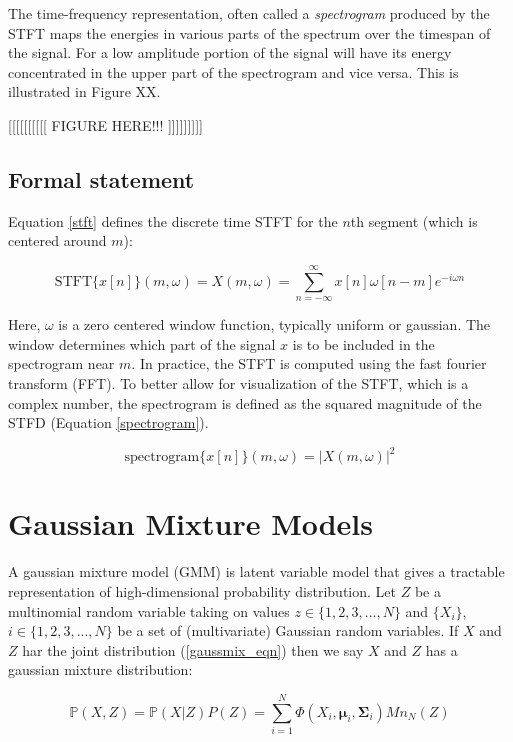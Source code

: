\documentclass[11pt, oneside, a4paper]{report}
\begin{document}
The time-frequency representation, often called a \emph{spectrogram} produced by the STFT maps the
energies in various parts of the spectrum over the timespan of the
signal. For a low amplitude portion of the signal will have its energy
concentrated in the upper part of the spectrogram and vice versa. This
is illustrated in Figure XX.

[[[[[[[[[[ FIGURE HERE!!! ]]]]]]]]]

\subsection{Formal statement}

Equation \ref{stft} defines the discrete time STFT for the $n$th
segment (which is centered around $m$):

\begin{equation}\label{stft}
  \text{STFT}\{x[n]\}(m,\omega)= X(m,\omega) =\sum_{n = -\infty}^{\infty}
  x[n]\omega[n-m]e^{-i\omega n}
\end{equation}

Here, $\omega$ is a zero centered window function, typically uniform
or gaussian. The window determines which part of the signal $x$ is to
be included in the spectrogram near $m$. In practice, the STFT is
computed using the fast fourier transform (FFT). To better allow for
visualization of the STFT, which is a complex number, the spectrogram
is defined as the squared magnitude of the STFD (Equation \ref{spectrogram}).

\begin{equation}\label{spectrogram}
  \text{spectrogram}\{x[n]\}(m,\omega) = |X(m,\omega)|^2 
\end{equation}


\section{Gaussian Mixture Models}\label{gmm_appendix}
A gaussian mixture model (GMM) is latent variable model that gives a
tractable representation of high-dimensional probability
distribution. Let $Z$ be a multinomial random variable taking on
values $z \in \{1,2,3,...,N\}$ and $\{X_i\}$, $i \in \{1,2,3,...,N\}$
be a set of (multivariate) Gaussian random variables. If $X$ and $Z$
har the joint distribution (\ref{gaussmix_eqn}) then we say $X$ and $Z$
has a gaussian mixture distribution:

\begin{equation}\label{gaussmix_eqn}
  \mathbb{P}(X,Z) = \mathbb{P}(X|Z)P(Z) = \sum_{i = 1}^N
  \Phi(X_i,\mathbf{\mu}_i, \mathbf{\Sigma}_i)Mn_N(Z)
\end{equation}
\end{document}
